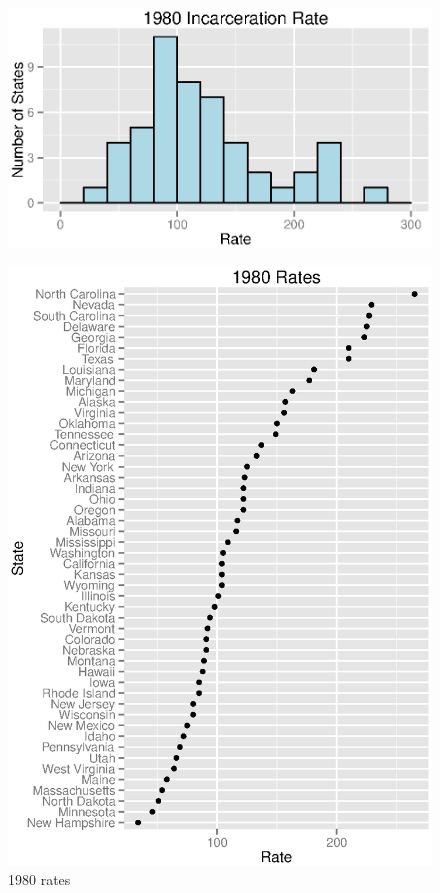 \documentclass{exam}
\begin{document}
  \begin{figure}[H]
    \centering
    \includegraphics[scale = 0.9]{figures/rate_histogram_1980.eps}
  \end{figure}

  \begin{figure}[H]
    \centering
    \includegraphics[scale = 0.9]{figures/state_rates_1980.eps}
    \caption{1980 rates}
  \end{figure}
\end{document}
